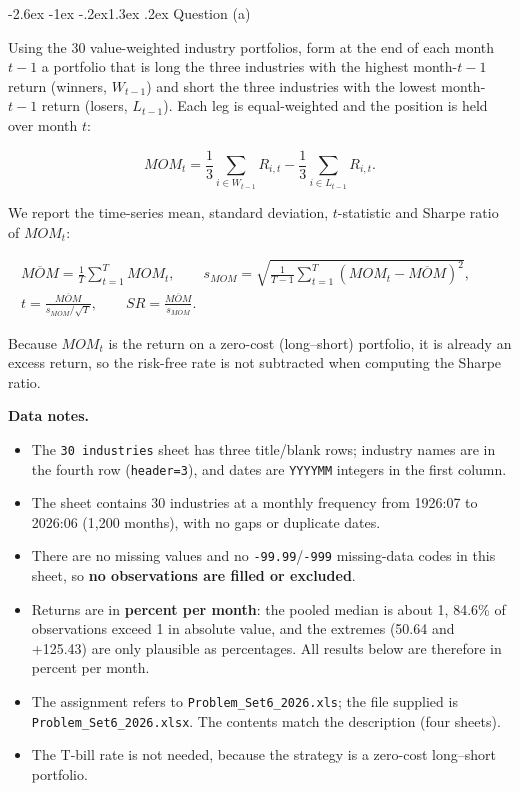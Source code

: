 \documentclass[11pt]{article}
\makeatletter
\renewcommand\section{\@startsection{section}{1}{0pt}%
  {-2.6ex \@plus -1ex \@minus -.2ex}{1.3ex \@plus .2ex}%
  {\normalfont\scshape\large\color{psink}}}   %
\makeatother
\begin{document}
\section{Question (a)}
 
Using the 30 value-weighted industry portfolios, form at the end of each month $t-1$ a portfolio that is long the three industries with the highest month-$t-1$ return (winners, $W_{t-1}$) and short the three industries with the lowest month-$t-1$ return (losers, $L_{t-1}$). Each leg is equal-weighted and the position is held over month $t$:
 
\begin{equation*}
MOM_t=\frac{1}{3}\sum_{i\in W_{t-1}}R_{i,t}-\frac{1}{3}\sum_{i\in L_{t-1}}R_{i,t}.
\end{equation*}
 
We report the time-series mean, standard deviation, $t$-statistic and Sharpe ratio of $MOM_t$:
 
\begin{gather*}
\overline{MOM}=\frac{1}{T}\sum_{t=1}^{T}MOM_t,\qquad
s_{MOM}=\sqrt{\frac{1}{T-1}\sum_{t=1}^{T}\left(MOM_t-\overline{MOM}\right)^2},\qquad \\
t=\frac{\overline{MOM}}{s_{MOM}/\sqrt{T}},\qquad
SR=\frac{\overline{MOM}}{s_{MOM}}.
\end{gather*}
 
Because $MOM_t$ is the return on a zero-cost (long--short) portfolio, it is already an excess return, so the risk-free rate is not subtracted when computing the Sharpe ratio.
 
\textbf{Data notes.}
\begin{itemize}
  \item The \texttt{30 industries} sheet has three title/blank rows; industry names are in the fourth row (\texttt{header=3}), and dates are \texttt{YYYYMM} integers in the first column.
  \item The sheet contains 30 industries at a monthly frequency from 1926:07 to 2026:06 (1,200 months), with no gaps or duplicate dates.
  \item There are no missing values and no \texttt{-99.99}/\texttt{-999} missing-data codes in this sheet, so \textbf{no observations are filled or excluded}.
  \item Returns are in \textbf{percent per month}: the pooled median is about 1, 84.6\% of observations exceed 1 in absolute value, and the extremes (\textminus{}50.64 and +125.43) are only plausible as percentages. All results below are therefore in percent per month.
  \item The assignment refers to \texttt{Problem\_\allowbreak{}Set6\_\allowbreak{}2026.xls}; the file supplied is \texttt{Problem\_\allowbreak{}Set6\_\allowbreak{}2026.xlsx}. The contents match the description (four sheets).
  \item The T-bill rate is not needed, because the strategy is a zero-cost long--short portfolio.
\end{itemize}
 
\end{document}

